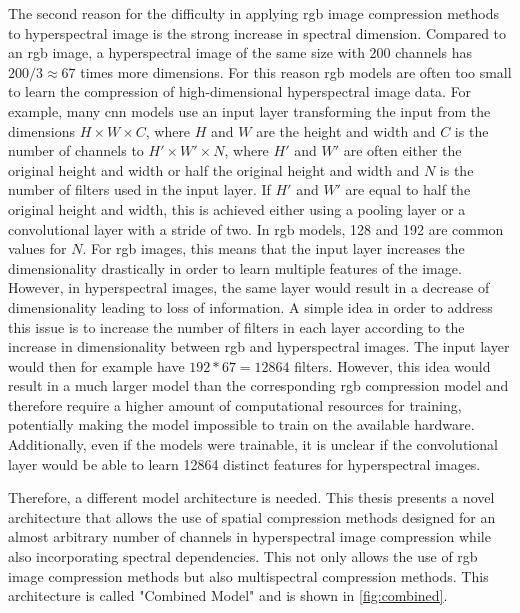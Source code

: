 The second reason for the difficulty in applying \ac{rgb} image compression methods to hyperspectral image is the strong increase in spectral dimension. Compared to an \ac{rgb} image, a hyperspectral image of the same size with 200 channels has $200/3 \approx 67$ times more dimensions. For this reason \ac{rgb} models are often too small to learn the compression of high-dimensional hyperspectral image data. For example, many \ac{cnn} models use an input layer transforming the input from the dimensions $H \times W \times C$, where $H$ and $W$ are the height and width and $C$ is the number of channels to $H' \times W' \times N$, where $H'$ and $W'$ are often either the original height and width or half the original height and width and $N$ is the number of filters used in the input layer. If $H'$ and $W'$ are equal to half the original height and width, this is achieved either using a pooling layer or a convolutional layer with a stride of two. In \ac{rgb} models, 128 and 192 are common values for $N$. For \ac{rgb} images, this means that the input layer increases the dimensionality drastically in order to learn multiple features of the image. However, in hyperspectral images, the same layer would result in a decrease of dimensionality leading to loss of information. A simple idea in order to address this issue is to increase the number of filters in each layer according to the increase in dimensionality between \ac{rgb} and hyperspectral images. The input layer would then for example have $192 * 67 = 12864$ filters. However, this idea would result in a much larger model than the corresponding \ac{rgb} compression model and therefore require a higher amount of computational resources for training, potentially making the model impossible to train on the available hardware. Additionally, even if the models were trainable, it is unclear if the convolutional layer would be able to learn 12864 distinct features for hyperspectral images.

Therefore, a different model architecture is needed. This thesis presents a novel architecture that allows the use of spatial compression methods designed for an almost arbitrary number of channels in hyperspectral image compression while also incorporating spectral dependencies. This not only allows the use of \ac{rgb} image compression methods but also multispectral compression methods. This architecture is called "Combined Model" and is shown in \autoref{fig:combined}.
